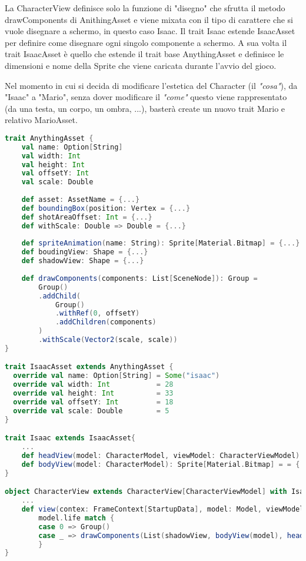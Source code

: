 La CharacterView definisce solo la funzione di "disegno" che sfrutta il metodo drawComponents di AnithingAsset 
e viene mixata con il tipo di carattere che si vuole disegnare a schermo, in questo caso Isaac.
Il trait Isaac estende IsaacAsset per definire come disegnare ogni singolo componente a schermo.
A sua volta il trait IsaacAsset è quello che estende il trait base AnythingAsset 
e definisce le dimensioni e nome della Sprite che viene caricata durante l'avvio del gioco.

Nel momento in cui si decida di modificare l'estetica del Character (il \textit{"cosa"}), da "Isaac" a "Mario",
senza dover modificare il \textit{"come"} questo viene rappresentato (da una testa, un corpo, un ombra, ...),
basterà create un nuovo trait Mario e relativo MarioAsset.

\begin{lstlisting}[language=Scala]
trait AnythingAsset {
	val name: Option[String]
	val width: Int
	val height: Int
	val offsetY: Int
	val scale: Double
	
	def asset: AssetName = {...}
	def boundingBox(position: Vertex = {...}
	def shotAreaOffset: Int = {...}
	def withScale: Double => Double = {...}
	
	def spriteAnimation(name: String): Sprite[Material.Bitmap] = {...}
	def boudingView: Shape = {...}
	def shadowView: Shape = {...}
	
	def drawComponents(components: List[SceneNode]): Group =
		Group()
		.addChild(
			Group()
			.withRef(0, offsetY)
			.addChildren(components)
		)
		.withScale(Vector2(scale, scale))
}

trait IsaacAsset extends AnythingAsset {
  override val name: Option[String] = Some("isaac")
  override val width: Int           = 28
  override val height: Int          = 33
  override val offsetY: Int         = 18
  override val scale: Double        = 5
}

trait Isaac extends IsaacAsset{
	...
	def headView(model: CharacterModel, viewModel: CharacterViewModel): Graphic[Material.Bitmap] = {...}
	def bodyView(model: CharacterModel): Sprite[Material.Bitmap] = = {...}
}

object CharacterView extends CharacterView[CharacterViewModel] with Isaac {
	...
	def view(contex: FrameContext[StartupData], model: Model, viewModel: ViewModel): View =
		model.life match {
		case 0 => Group()
		case _ => drawComponents(List(shadowView, bodyView(model), headView(model, viewModel)))
		}
}
\end{lstlisting}	


